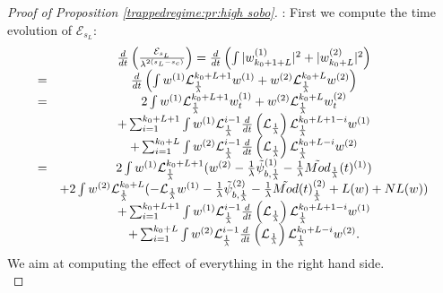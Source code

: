 \documentclass[11pt,a4paper,reqno]{amsart}
\theoremstyle{remark}
\numberwithin{equation}{section}
\begin{document}
\begin{proof}[Proof of Proposition \ref{trappedregime:pr:high sobo}]: First we compute the time evolution of $\mathcal{E}_{s_L}$:
\begin{equation} \label{thetrapped:highsobo:eq:expression derivee}
\begin{array}{r c l}
&\frac{d}{dt}\left( \frac{\mathcal{E}_{s_L}}{\lambda^{2(s_L-s_c)}} \right) =
\frac{d}{dt}\left( \int |w^{(1)}_{k_0+1+L}|^2+|w^{(2)}_{k_0+L}|^2 \right) \\
=& \frac{d}{dt}\left( \int w^{(1)}\mathcal{L}_{\frac{1}{\lambda}}^{k_0+L+1}w^{(1)}+w^{(2)}\mathcal{L}_{\frac{1}{\lambda}}^{k_0+L}w^{(2)} \right) \\
=& 2\int w^{(1)}\mathcal{L}_{\frac{1}{\lambda}}^{k_0+L+1}w_t^{(1)}+w^{(2)}\mathcal{L}_{\frac{1}{\lambda}}^{k_0+L}w_t^{(2)} \\
& +\sum_{i=1}^{k_0+L+1} \int w^{(1)} \mathcal{L}_{\frac{1}{\lambda}}^{i-1}\frac{d}{dt}\left( \mathcal{L}_{\frac{1}{\lambda}}\right)\mathcal{L}_{\frac{1}{\lambda}}^{k_0+L+1-i} w^{(1)} \\
&+\sum_{i=1}^{k_0+L} \int w^{(2)} \mathcal{L}_{\frac{1}{\lambda}}^{i-1}\frac{d}{dt}\left( \mathcal{L}_{\frac{1}{\lambda}}\right) \mathcal{L}_{\frac{1}{\lambda}}^{k_0+L-i} w^{(2)} \\
=& 2\int w^{(1)}\mathcal{L}_{\frac{1}{\lambda}}^{k_0+L+1} (w^{(2)}-\frac{1}{\lambda}\tilde{\psi}_{b,\frac{1}{\lambda}}^{(1)} -\frac{1}{\lambda} \tilde{Mod}_{\frac{1}{\lambda}}(t)^{(1)})\\
&+2\int w^{(2)}\mathcal{L}_{\frac{1}{\lambda}}^{k_0+L} (-\mathcal{L}_{\frac{1}{\lambda}}w^{(1)}-\frac{1}{\lambda}\tilde{\psi}_{b,\frac{1}{\lambda}}^{(2)} -\frac{1}{\lambda} \tilde{Mod}(t)_{\frac{1}{\lambda}}^{(2)}+L(w)+NL(w))\\
&+\sum_{i=1}^{k_0+L+1} \int w^{(1)} \mathcal{L}_{\frac{1}{\lambda}}^{i-1}\frac{d}{dt}\left( \mathcal{L}_{\frac{1}{\lambda}}\right)\mathcal{L}_{\frac{1}{\lambda}}^{k_0+L+1-i} w^{(1)} \\
&+\sum_{i=1}^{k_0+L} \int w^{(2)} \mathcal{L}_{\frac{1}{\lambda}}^{i-1}\frac{d}{dt}\left( \mathcal{L}_{\frac{1}{\lambda}}\right) \mathcal{L}_{\frac{1}{\lambda}}^{k_0+L-i} w^{(2)} .
\end{array}
\end{equation}
We aim at computing the effect of everything in the right hand side.\\


\end{proof}
\end{document}

